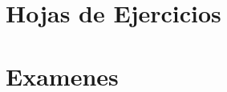 \documentclass{apuntes}
\begin{document}






%



\chapter{Hojas de Ejercicios}
%

\chapter{Examenes}

\end{document}
